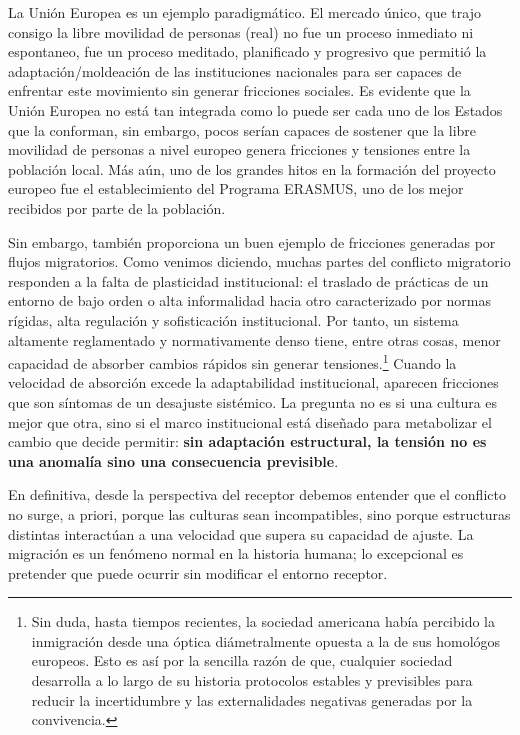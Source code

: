\documentclass[10pt,a4paper]{article}
\begin{document}
La Unión Europea es un ejemplo paradigmático. El mercado único, que trajo consigo la libre movilidad de personas (real) no fue un proceso inmediato ni espontaneo, fue un proceso meditado, planificado y progresivo que permitió la adaptación/moldeación de las instituciones nacionales para ser capaces de enfrentar este movimiento sin generar fricciones sociales. Es evidente que la Unión Europea no está tan integrada como lo puede ser cada uno de los Estados que la conforman, sin embargo, pocos serían capaces de sostener que la libre movilidad de personas a nivel europeo genera fricciones y tensiones entre la población local. Más aún, uno de los grandes hitos en la formación del proyecto europeo fue el establecimiento del Programa ERASMUS, uno de los mejor recibidos por parte de la población.

Sin embargo, también proporciona un buen ejemplo de fricciones generadas por flujos migratorios. Como venimos diciendo, muchas partes del conflicto migratorio responden a la falta de plasticidad institucional: el traslado de prácticas de un entorno de bajo orden o alta informalidad hacia otro caracterizado por normas rígidas, alta regulación y sofisticación institucional. Por tanto, un sistema altamente reglamentado y normativamente denso tiene, entre otras cosas, menor capacidad de absorber cambios rápidos sin generar tensiones.\footnote{%
    Sin duda, hasta tiempos recientes, la sociedad americana había percibido la inmigración desde una óptica diámetralmente opuesta a la de sus homológos europeos. Esto es así por la sencilla razón de que, cualquier sociedad desarrolla a lo largo de su historia protocolos estables y previsibles para reducir la incertidumbre y las externalidades negativas generadas por la convivencia.
} Cuando la velocidad de absorción excede la adaptabilidad institucional, aparecen fricciones que son síntomas de un desajuste sistémico. La pregunta no es si una cultura es mejor que otra, sino si el marco institucional está diseñado para metabolizar el cambio que decide permitir: \textbf{sin adaptación estructural, la tensión no es una anomalía sino una consecuencia previsible}.

En definitiva, desde la perspectiva del receptor debemos entender que el conflicto no surge, a priori, porque las culturas sean incompatibles, sino porque estructuras distintas interactúan a una velocidad que supera su capacidad de ajuste. La migración es un fenómeno normal en la historia humana; lo excepcional es pretender que puede ocurrir sin modificar el entorno receptor.
\end{document}
